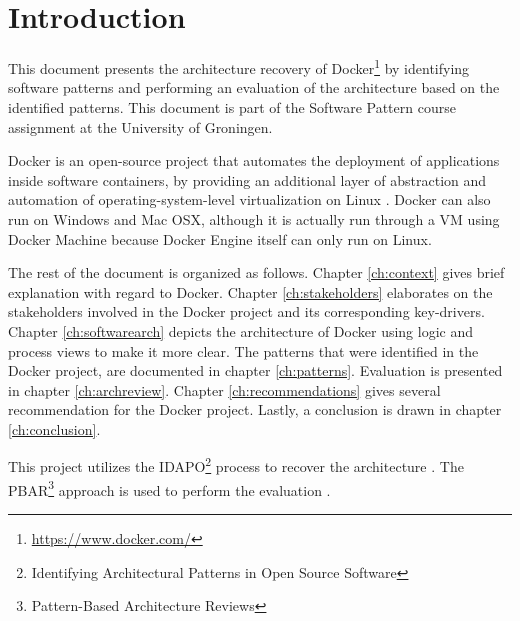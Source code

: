 \clearpage
\chapter{Introduction}
\label{ch:introduction}
This document presents the architecture recovery of
Docker\footnote{\url{https://www.docker.com/}} by identifying software patterns
and performing an evaluation of the architecture based on the identified
patterns. This document is part of the Software Pattern course assignment at the
University of Groningen.

Docker is an open-source project that automates the deployment of applications
inside software containers, by providing an additional layer of abstraction and
automation of operating-system-level virtualization on Linux \cite{dockerdef}.
Docker can also run on Windows and Mac OSX, although it is actually run through
a VM using Docker Machine because Docker Engine itself can only run on Linux.

The rest of the document is organized as follows. Chapter \ref{ch:context}
gives brief explanation with regard to Docker. Chapter \ref{ch:stakeholders}
elaborates on the stakeholders involved in the Docker project and its
corresponding key-drivers. Chapter \ref{ch:softwarearch} depicts the
architecture of Docker using logic and process views to make it more clear.
The patterns that were identified in the Docker project, are documented in chapter
\ref{ch:patterns}. Evaluation is presented in chapter \ref{ch:archreview}.
Chapter \ref{ch:recommendations} gives several recommendation for the Docker
project. Lastly, a conclusion is drawn in chapter \ref{ch:conclusion}.

This project utilizes the IDAPO\footnote{Identifying Architectural Patterns in
Open Source Software} process to recover the architecture \cite{idapo}. The
PBAR\footnote{Pattern-Based Architecture Reviews} approach is used to perform
the evaluation \cite{pbar}.

